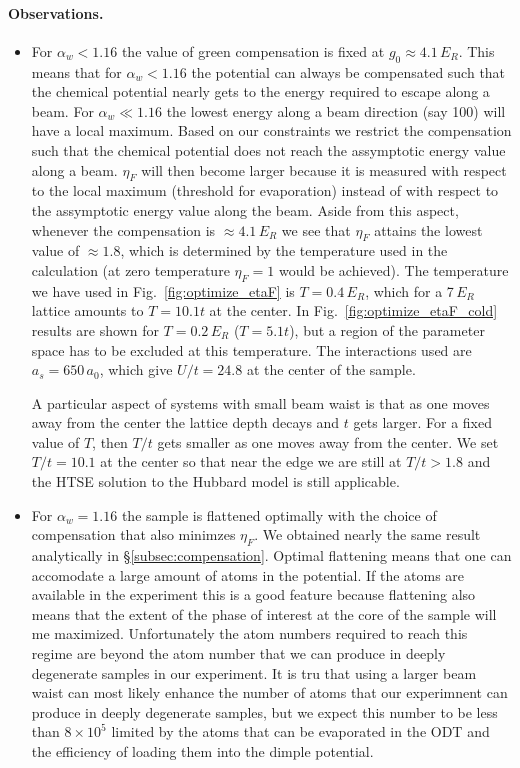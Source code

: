 \documentclass[11pt,letter]{article}
\newcommand{\awaist}{\ensuremath{ \alpha_{w} }}
\begin{document}
\paragraph{Observations.} 

\begin{itemize} 
\item For $\awaist<1.16$ the value of green compensation is fixed at
$g_{0}\approx 4.1\,E_{R}$.   This means that for $\awaist < 1.16$ the potential
can always be compensated such that the chemical potential nearly gets to the
energy required to escape along a beam.   For $\awaist \ll 1.16$  the lowest
energy along a beam direction (say 100) will have a local maximum. Based on our
constraints we restrict the compensation such that the chemical potential does
not reach the assymptotic energy value along a beam.   $\eta_{F}$ will then
become larger because it is measured with respect to the local maximum
(threshold for evaporation) instead of with respect to the assymptotic energy
value along the beam.  Aside from this aspect, whenever the compensation is
$\approx 4.1\,E_{R}$  we see that $\eta_{F}$ attains the lowest value of
$\approx 1.8$, which is determined by the temperature used in the calculation
(at zero temperature $\eta_{F}=1$ would be achieved).  The temperature we have
used in Fig.~\ref{fig:optimize_etaF} is $T=0.4\,E_{R}$, which for a 7\,$E_{R}$
lattice amounts to $T=10.1t$ at the center.   In
Fig.~\ref{fig:optimize_etaF_cold} results are shown for $T=0.2\,E_{R}$
($T=5.1t$), but a region of the parameter space has to be excluded at this
temperature.  The interactions used  are $a_{s}=650\,a_{0}$, which give
$U/t=24.8$ at the center of the sample. 

A particular aspect of systems with small beam waist is that as one moves away
from the center the lattice depth decays and $t$ gets larger.   For a fixed
value of $T$, then $T/t$ gets smaller as one moves away from the center.  We
set $T/t=10.1$ at the center so that near the edge we are still at $T/t > 1.8$
and the HTSE solution to the Hubbard model is still applicable.   

\item For $\awaist = 1.16$  the sample is flattened optimally with the choice
of compensation that also minimzes $\eta_{F}$.  We obtained nearly the same
result analytically in \S\ref{subsec:compensation}.    Optimal flattening means
that one can accomodate a large amount of atoms in the potential.   If the
atoms are available in the experiment this is a good feature because flattening
also means that the extent of the phase of interest at the core of the sample
will me maximized.  Unfortunately the atom numbers required to reach this
regime are beyond the atom number that we can produce in deeply degenerate
samples in our experiment.  It is tru that using a larger beam waist can most
likely enhance the number of atoms that our experimnent can produce in deeply
degenerate samples, but we expect this number to be less than $8\times10^{5}$
limited by the atoms that can be evaporated in the ODT and the efficiency of
loading them into the dimple potential.   


\end{itemize}
\end{document}

